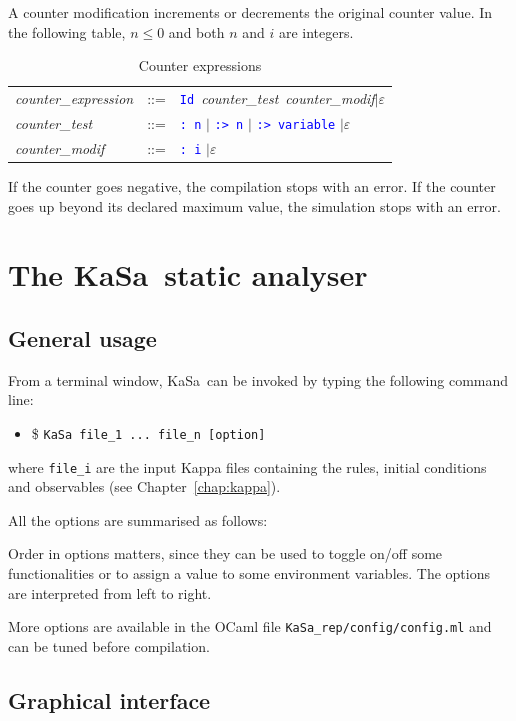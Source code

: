 \documentclass[11pt]{book}
\def\KaSa{\textsf{KaSa}}
\def\tcb#1{\textcolor{blue}{\ttt{#1}}}
\def\ttt#1{\texttt{#1}}
\def\ITE#1{\begin{itemize}#1\end{itemize}}
\begin{document}
A counter modification increments or decrements the original counter value. In the following table, $n\leq 0$ and both $n$ and $i$ are integers.
\begin{table}[ht!]
  \centering
  \caption{Counter expressions}
  \begin{tabular}{@{} lcl @{}}
    \textit{counter\_expression} & ::= & \tcb{Id}~\textit{counter\_test}~\textit{counter\_modif}$\mid\varepsilon$ \\
    \textit{counter\_test} & ::= & \tcb{: n} $\mid$ \tcb{:> n} $\mid$ \tcb{:> variable} $\mid\varepsilon$\\
    \textit{counter\_modif} & ::= & \tcb{: i} $\mid\varepsilon$\\
    \end{tabular}
\end{table}

If the counter goes negative, the compilation stops with an error. If the counter goes up beyond its declared maximum value, the simulation stops with an error.

\chapter{The \KaSa~static analyser}

\section{General usage}

From a terminal window, \KaSa~can be invoked by typing the following command line:
\ITE{
\item[\$] \ttt{KaSa file\_1 ... file\_n  [option]}
}
where \ttt{file\_i} are the input Kappa files containing the rules, initial conditions and observables (see Chapter~\ref{chap:kappa}).

All the options are summarised as follows:


Order in options matters, since they can be used to toggle on/off some functionalities or to assign a value to some environment variables.
The options are interpreted from left to right.

More options are available in the OCaml file \texttt{KaSa\_rep/config/config.ml} and can be tuned before compilation.

\section{Graphical interface}
\end{document}
